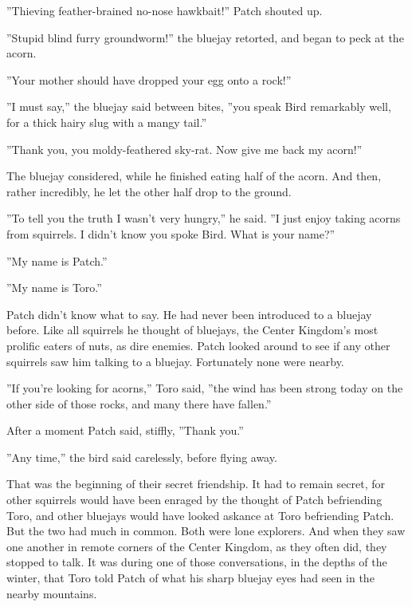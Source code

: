 \documentclass[11pt]{article}
\begin{document}
''Thieving feather-brained no-nose hawkbait!'' Patch shouted up.\par
''Stupid blind furry groundworm!'' the bluejay retorted, and began to peck at the acorn.\par
''Your mother should have dropped your egg onto a rock!''\par
''I must say,'' the bluejay said between bites, ''you speak Bird remarkably well, for a thick hairy slug with a mangy tail.''\par
''Thank you, you moldy-feathered sky-rat. Now give me back my acorn!''\par
The bluejay considered, while he finished eating half of the acorn. And then, rather incredibly, he let the other half drop to the ground.\par
''To tell you the truth I wasn't very hungry,'' he said. ''I just enjoy taking acorns from squirrels. I didn't know you spoke Bird. What is your name?''\par
''My name is Patch.''\par
''My name is Toro.''\par
Patch didn't know what to say. He had never been introduced to a bluejay before. Like all squirrels he thought of bluejays, the Center Kingdom's most prolific eaters of nuts, as dire enemies. Patch looked around to see if any other squirrels saw him talking to a bluejay. Fortunately none were nearby.\par
''If you're looking for acorns,'' Toro said, ''the wind has been strong today on the other side of those rocks, and many there have fallen.''\par
After a moment Patch said, stiffly, ''Thank you.''\par
''Any time,'' the bird said carelessly, before flying away.\par
That was the beginning of their secret friendship. It had to remain secret, for other squirrels would have been enraged by the thought of Patch befriending Toro, and other bluejays would have looked askance at Toro befriending Patch. But the two had much in common. Both were lone explorers. And when they saw one another in remote corners of the Center Kingdom, as they often did, they stopped to talk. It was during one of those conversations, in the depths of the winter, that Toro told Patch of what his sharp bluejay eyes had seen in the nearby mountains.\par
\par
\end{document}
